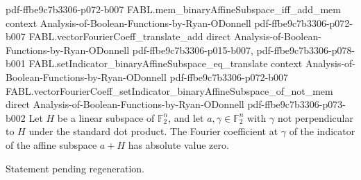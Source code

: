 \begin{theorem}
  {pdf-ffbe9c7b3306-p072-b007}
\proofstep
  {FABL.mem_binaryAffineSubspace_iff_add_mem}
  {context}
  {Analysis-of-Boolean-Functions-by-Ryan-ODonnell}
  {pdf-ffbe9c7b3306-p072-b007}
\proofstep
  {FABL.vectorFourierCoeff_translate_add}
  {direct}
  {Analysis-of-Boolean-Functions-by-Ryan-ODonnell}
  {pdf-ffbe9c7b3306-p015-b007,
    pdf-ffbe9c7b3306-p078-b001}
\proofstep
  {FABL.setIndicator_binaryAffineSubspace_eq_translate}
  {context}
  {Analysis-of-Boolean-Functions-by-Ryan-ODonnell}
  {pdf-ffbe9c7b3306-p072-b007}
\proofstep
  {FABL.vectorFourierCoeff_setIndicator_binaryAffineSubspace_of_not_mem}
  {direct}
  {Analysis-of-Boolean-Functions-by-Ryan-ODonnell}
  {pdf-ffbe9c7b3306-p073-b002}
Let $H$ be a linear subspace of $\mathbb F_2^n$, and let $a,\gamma\in\mathbb F_2^n$ with
$\gamma$ not perpendicular to $H$ under the standard dot product. The Fourier
coefficient at $\gamma$ of the indicator of the affine subspace $a+H$ has absolute value
zero.
\end{theorem}

\begin{theorem}
\label{FABL.spectralInfinityNorm_setIndicator_binaryAffineSubspace}
\leanok
{}
Statement pending regeneration.
\end{theorem}

